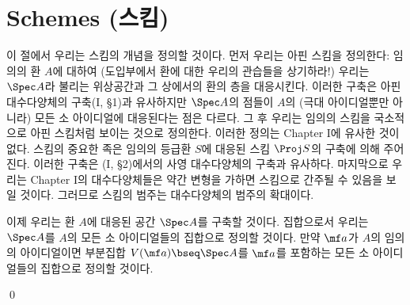 	
	
	\section{Schemes (스킴)}
	이 절에서 우리는 스킴의 개념을 정의할 것이다. 먼저 우리는 아핀 스킴을 정의한다: 임의의 환 $A$에 대하여
	(도입부에서 환에 대한 우리의 관습들을 상기하라!) 우리는 $\Spec A$라 불리는 위상공간과 그 상에서의 환의 층을 대응시킨다.
	이러한 구축은 아핀 대수다양체의 구축(I, \S 1)과 유사하지만 $\Spec A$의 점들이 $A$의 (극대 아이디얼뿐만 아니라)
	모든 소 아이디얼에 대응된다는 점은 다르다.
	그 후 우리는 임의의 스킴을 국소적으로 아핀 스킴처럼 보이는 것으로 정의한다. 이러한 정의는 Chapter I에 유사한 것이 없다.
	스킴의 중요한 족은 임의의 등급환 $S$에 대응된 스킴 $\Proj S$의 구축에 의해 주어진다.
	이러한 구축은 (I, \S 2)에서의 사영 대수다양체의 구축과 유사하다.
	마지막으로 우리는 Chapter I의 대수다양체들은 약간 변형을 가하면 스킴으로 간주될 수 있음을 보일 것이다.
	그러므로 스킴의 범주는 대수다양체의 범주의 확대이다.
	
	이제 우리는 환 $A$에 대응된 공간 $\Spec A$를 구축할 것이다.
	집합으로서 우리는 $\Spec A$를 $A$의 모든 소 아이디얼들의 집합으로 정의할 것이다.
	만약 $\mf a$가 $A$의 임의의 아이디얼이면 부분집합 $V(\mf a)\bseq\Spec A$를
	$\mf a$를 포함하는 모든 소 아이디얼들의 집합으로 정의할 것이다.
	
	
	\begin{lemma}
		\qed
	\end{lemma}
	
